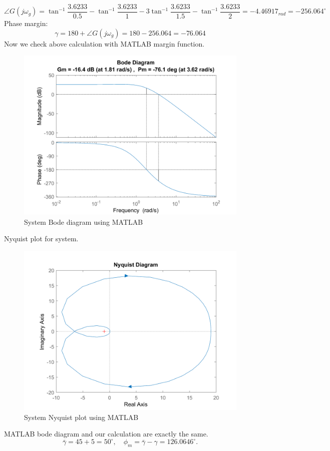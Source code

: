 $$
\angle G(j\omega_g) = \tan^{-1}\dfrac{3.6233}{0.5} - \tan^{-1}\dfrac{3.6233}{1} - 3\tan^{-1}\dfrac{3.6233}{1.5} - \tan^{-1}\dfrac{3.6233}{2} = -4.46917_{rad} = -256.064^{\circ}
$$
Phase margin:
$$
\gamma = 180 + \angle G(j\omega_g) = 180 - 256.064 = -76.064
$$
Now we check above calculation with MATLAB margin function.
\begin{figure}[H]
	\caption{System Bode diagram using MATLAB}
	\centering
	\includegraphics[width=12cm]{../Figure/Q1/a/margin.png}
\end{figure}
Nyquist plot for system.
\begin{figure}[H]
	\caption{System Nyquist plot using MATLAB}
	\centering
	\includegraphics[width=12cm]{../Figure/Q1/a/system_nyquist.png}
\end{figure}
MATLAB bode diagram and our calculation are exactly the same.
$$
\bar{\gamma} = 45 + 5 = 50^{\circ},\quad \phi_m = \bar{\gamma} - \gamma = 126.0646^{\circ}.
$$
